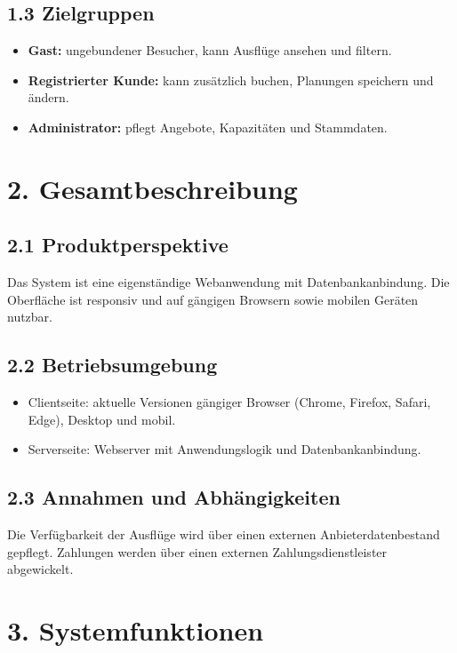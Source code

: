 \documentclass[
	fontsize=12pt,          %
	paper=a4,               %
	numbers=noenddot,       %
	listof=totoc,           %
	listof=entryprefix,     %
	listof=nochaptergap,    %
	bibliography=totoc,     %
	parskip=half,           %
	openany                 %
]{scrbook}
\begin{document}
\section*{1.3 Zielgruppen}

\begin{itemize}
	\item \textbf{Gast:} ungebundener Besucher, kann Ausflüge ansehen und filtern.
	\item \textbf{Registrierter Kunde:} kann zusätzlich buchen, Planungen speichern und ändern.
	\item \textbf{Administrator:} pflegt Angebote, Kapazitäten und Stammdaten.
\end{itemize}


\chapter*{2. Gesamtbeschreibung}


\section*{2.1 Produktperspektive}

Das System ist eine eigenständige Webanwendung mit Datenbankanbindung.
Die Oberfläche ist responsiv und auf gängigen Browsern sowie mobilen Geräten nutzbar.


\section*{2.2 Betriebsumgebung}

\begin{itemize}
	\item Clientseite: aktuelle Versionen gängiger Browser (Chrome, Firefox, Safari, Edge), Desktop und mobil.
	\item Serverseite: Webserver mit Anwendungslogik und Datenbankanbindung.
\end{itemize}


\section*{2.3 Annahmen und Abhängigkeiten}

Die Verfügbarkeit der Ausflüge wird über einen externen Anbieterdatenbestand gepflegt.
Zahlungen werden über einen externen Zahlungsdienstleister abgewickelt.


\chapter*{3. Systemfunktionen}
\end{document}
